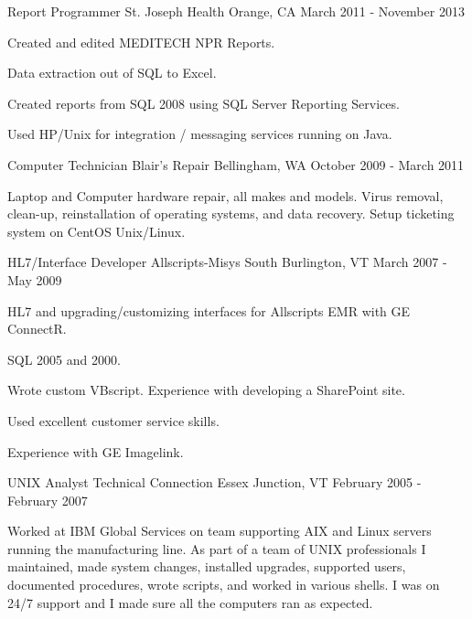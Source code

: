 \begin{cventries}
  \cventry
    {Report Programmer}
    {St. Joseph Health}
    {Orange, CA}
    {March 2011 - November 2013}
    {
      \begin{cvitems}
        \item {Created and edited MEDITECH NPR Reports.}
        \item {Data extraction out of SQL to Excel.}
        \item {Created reports from SQL 2008 using SQL Server Reporting Services.}
        \item {Used HP/Unix for integration / messaging services running on Java.}
      \end{cvitems} 
    }
  \cventry
    {Computer Technician}
    {Blair’s Repair}
    {Bellingham, WA}
    {October 2009 - March 2011}
    {
      \begin{cvitems}
        \item {Laptop and Computer hardware repair, all makes and models. Virus removal, clean-up, reinstallation of operating systems, and data recovery. Setup ticketing system on CentOS Unix/Linux.}
      \end{cvitems}
    }
  \cventry
    {HL7/Interface Developer}
    {Allscripts-Misys}
    {South Burlington, VT}
    {March 2007 - May 2009}
    {
      \begin{cvitems}
        \item {HL7 and upgrading/customizing interfaces for Allscripts EMR with GE ConnectR.}
        \item {SQL 2005 and 2000.}
        \item {Wrote custom VBscript. Experience with developing a SharePoint site.}
        \item {Used excellent customer service skills.}
        \item {Experience with GE Imagelink.}
      \end{cvitems}
    }
  \cventry
    {UNIX Analyst}
    {Technical Connection}
    {Essex Junction, VT}
    {February 2005 - February 2007}
    {
      \begin{cvitems}
        \item {Worked at IBM Global Services on team supporting AIX and Linux servers running the manufacturing line. As part of a team of UNIX professionals I maintained, made system changes, installed upgrades, supported users, documented procedures, wrote scripts, and worked in various shells. I was on 24/7 support and I made sure all the computers ran as expected.}
      \end{cvitems}
    }
\end{cventries}
